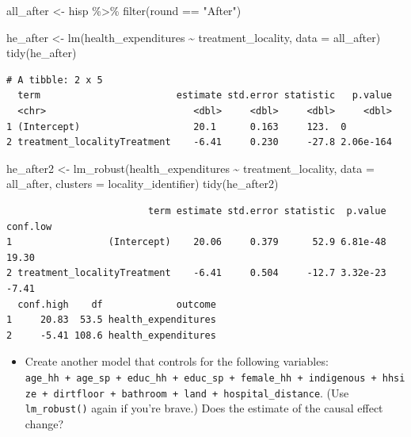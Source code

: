 \documentclass[
  letterpaper,
  DIV=11,
  numbers=noendperiod]{scrartcl}
\newenvironment{Shaded}{\begin{snugshade}}{\end{snugshade}}
\newcommand{\AttributeTok}[1]{\textcolor[rgb]{0.40,0.45,0.13}{#1}}
\newcommand{\FunctionTok}[1]{\textcolor[rgb]{0.28,0.35,0.67}{#1}}
\newcommand{\NormalTok}[1]{\textcolor[rgb]{0.00,0.23,0.31}{#1}}
\newcommand{\OtherTok}[1]{\textcolor[rgb]{0.00,0.23,0.31}{#1}}
\newcommand{\SpecialCharTok}[1]{\textcolor[rgb]{0.37,0.37,0.37}{#1}}
\newcommand{\StringTok}[1]{\textcolor[rgb]{0.13,0.47,0.30}{#1}}
\providecommand{\tightlist}{%
  \setlength{\itemsep}{0pt}\setlength{\parskip}{0pt}}\usepackage{longtable,booktabs,array}
\begin{document}
\begin{Shaded}
\begin{Highlighting}[numbers=left,,]
\NormalTok{all\_after }\OtherTok{\textless{}{-}}\NormalTok{ hisp }\SpecialCharTok{\%\textgreater{}\%} 
  \FunctionTok{filter}\NormalTok{(round }\SpecialCharTok{==} \StringTok{"After"}\NormalTok{) }

\NormalTok{he\_after }\OtherTok{\textless{}{-}} \FunctionTok{lm}\NormalTok{(health\_expenditures }\SpecialCharTok{\textasciitilde{}}\NormalTok{ treatment\_locality, }\AttributeTok{data =}\NormalTok{ all\_after)}
\FunctionTok{tidy}\NormalTok{(he\_after)}
\end{Highlighting}
\end{Shaded}

\begin{verbatim}
# A tibble: 2 x 5
  term                        estimate std.error statistic   p.value
  <chr>                          <dbl>     <dbl>     <dbl>     <dbl>
1 (Intercept)                    20.1      0.163     123.  0        
2 treatment_localityTreatment    -6.41     0.230     -27.8 2.06e-164
\end{verbatim}

\begin{Shaded}
\begin{Highlighting}[numbers=left,,]
\NormalTok{he\_after2 }\OtherTok{\textless{}{-}} \FunctionTok{lm\_robust}\NormalTok{(health\_expenditures }\SpecialCharTok{\textasciitilde{}}\NormalTok{ treatment\_locality, }
                       \AttributeTok{data =}\NormalTok{ all\_after, }\AttributeTok{clusters =}\NormalTok{ locality\_identifier)}
\FunctionTok{tidy}\NormalTok{(he\_after2)}
\end{Highlighting}
\end{Shaded}

\begin{verbatim}
                         term estimate std.error statistic  p.value conf.low
1                 (Intercept)    20.06     0.379      52.9 6.81e-48    19.30
2 treatment_localityTreatment    -6.41     0.504     -12.7 3.32e-23    -7.41
  conf.high    df             outcome
1     20.83  53.5 health_expenditures
2     -5.41 108.6 health_expenditures
\end{verbatim}

\begin{itemize}
\tightlist
\item
  Create another model that controls for the following variables:
  \texttt{age\_hh\ +\ age\_sp\ +\ educ\_hh\ +\ educ\_sp\ +\ female\_hh\ +\ indigenous\ +\ hhsize\ +\ dirtfloor\ +\ bathroom\ +\ land\ +\ hospital\_distance}.
  (Use \texttt{lm\_robust()} again if you're brave.) Does the estimate
  of the causal effect change?
\end{itemize}
\end{document}
